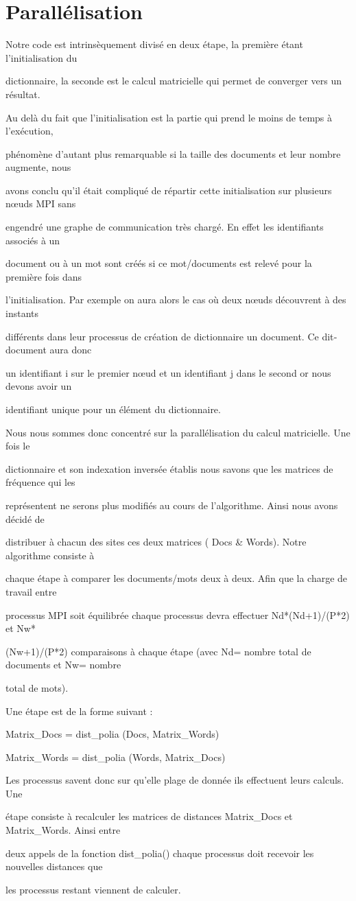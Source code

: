 \section{Parallélisation}

Notre code est intrinsèquement divisé en deux étape, la première étant l'initialisation du

dictionnaire, la seconde est le calcul matricielle qui permet de converger vers un résultat.

Au delà du fait que l'initialisation est la partie qui prend le moins de temps à l'exécution,

phénomène d'autant plus remarquable si la taille des documents et leur nombre augmente, nous

avons conclu qu'il était compliqué de répartir cette initialisation sur plusieurs nœuds MPI sans

engendré une graphe de communication très chargé. En effet les identifiants associés à un

document ou à un mot sont créés si ce mot/documents est relevé pour la première fois dans

l'initialisation. Par exemple on aura alors le cas où deux nœuds découvrent à des instants

différents dans leur processus de création de dictionnaire un document. Ce dit­document aura donc

un identifiant i sur le premier nœud et un identifiant j dans le second or nous devons avoir un

identifiant unique pour un élément du dictionnaire.

Nous nous sommes donc concentré sur la parallélisation du calcul matricielle. Une fois le

dictionnaire et son indexation inversée établis nous savons que les matrices de fréquence qui les

représentent ne serons plus modifiés au cours de l'algorithme. Ainsi nous avons décidé de

distribuer à chacun des sites ces deux matrices ( Docs & Words). Notre algorithme consiste à

chaque étape à comparer les documents/mots deux à deux. Afin que la charge de travail entre

processus MPI soit équilibrée chaque processus devra effectuer Nd*(Nd+1)/(P*2) et Nw*

(Nw+1)/(P*2) comparaisons à chaque étape (avec Nd= nombre total de documents et Nw= nombre

total de mots).

Une étape est de la forme suivant :

Matrix_Docs = dist_polia (Docs, Matrix_Words)

Matrix_Words = dist_polia (Words, Matrix_Docs)

Les processus savent donc sur qu'elle plage de donnée ils effectuent leurs calculs. Une

étape consiste à recalculer les matrices de distances Matrix_Docs et Matrix_Words. Ainsi entre

deux appels de la fonction dist_polia() chaque processus doit recevoir les nouvelles distances que

les processus restant viennent de calculer.
